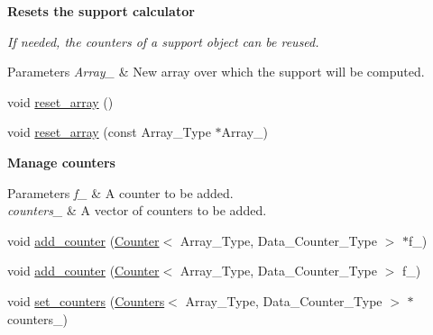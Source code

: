 \begin{Indent}\textbf{ Resets the support calculator}\par
{\em If needed, the counters of a support object can be reused.


\begin{DoxyParams}{Parameters}
{\em Array\+\_\+} & New array over which the support will be computed. \\
\hline
\end{DoxyParams}
}\begin{DoxyCompactItemize}
\item 
void \hyperlink{class_support_a4f2860fd2e8e30703b91633a92ed7a58}{reset\+\_\+array} ()
\item 
void \hyperlink{class_support_a6e39b22dfd1e0a0ceebf596c974f5326}{reset\+\_\+array} (const Array\+\_\+\+Type $\ast$Array\+\_\+)
\end{DoxyCompactItemize}
\end{Indent}
\begin{Indent}\textbf{ Manage counters}\par
{\em 
\begin{DoxyParams}{Parameters}
{\em f\+\_\+} & A counter to be added. \\
\hline
{\em counters\+\_\+} & A vector of counters to be added. \\
\hline
\end{DoxyParams}
}\begin{DoxyCompactItemize}
\item 
void \hyperlink{class_support_a364df2c6295341f2801ebe0419d1d97c}{add\+\_\+counter} (\hyperlink{class_counter}{Counter}$<$ Array\+\_\+\+Type, Data\+\_\+\+Counter\+\_\+\+Type $>$ $\ast$f\+\_\+)
\item 
void \hyperlink{class_support_a00d511970c0bf833ef8bdd7580c670cc}{add\+\_\+counter} (\hyperlink{class_counter}{Counter}$<$ Array\+\_\+\+Type, Data\+\_\+\+Counter\+\_\+\+Type $>$ f\+\_\+)
\item 
void \hyperlink{class_support_aef83474cda55c4ed52e313e8ed948b08}{set\+\_\+counters} (\hyperlink{class_counters}{Counters}$<$ Array\+\_\+\+Type, Data\+\_\+\+Counter\+\_\+\+Type $>$ $\ast$counters\+\_\+)
\end{DoxyCompactItemize}
\end{Indent}
